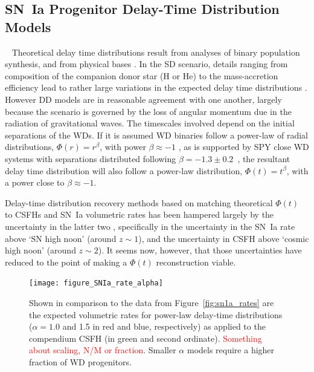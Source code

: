 \documentclass[apj]{aastex62}
\begin{document}
\subsection{SN~Ia Progenitor Delay-Time Distribution Models}~\label{sec:dtd}
Theoretical delay time distributions result from analyses of binary population synthesis, and from physical bases \cite[see][ for a review]{Wang:2012a}.  In the SD scenario, details ranging from composition of the companion donor star (H or He) to the mass-accretion efficiency lead to rather large variations in the expected delay time distributions \cite{Nelemans:2013}. However DD models are in reasonable agreement with one another, largely because the scenario is governed by the loss of angular momentum due in the radiation of gravitational waves. The timescales involved depend on the  initial separations of the WDs. If it is assumed WD binaries follow a power-law of radial distributions, $\Phi(r)=r^{\beta}$, with power $\beta\approx-1$ \citep{Opik:1924xr}, as is supported by  SPY close WD systems with separations distributed following $\beta=-1.3\pm0.2$~\citep{Maoz:2017zl}, the resultant delay time distribution will also follow a power-law distribution, $\Phi(t)=t^{\beta}$, with a power close to $\beta\approx-1$.

Delay-time distribution recovery methods based on matching theoretical $\Phi(t)$ to CSFHs and SN~Ia volumetric rates has been hampered largely by the uncertainty in the latter two \citep{Dahlen:2008,Strolger:2010,Graur:2014,Rodney:2014fj}, specifically in the uncertainty in the SN~Ia rate above `SN high noon' (around $z\sim1$), and the uncertainty in CSFH above `cosmic high noon' (around $z\sim2$). It seems now, however, that those uncertainties have reduced to the point of making a $\Phi(t)$ reconstruction viable.

\begin{figure}[t]
   \centering
   \texttt{[image: figure\_SNIa\_rate\_alpha]}
   \caption{\footnotesize Shown in comparison to the data from Figure~\ref{fig:sn1a_rates} are the expected volumetric rates for power-law delay-time distributions ($\alpha = 1.0$ and 1.5 in red and blue, respectively) as applied to the compendium CSFH (in green and second ordinate). \textcolor{red}{Something about scaling, N/M or fraction}. Smaller $\alpha$ models require a higher fraction of WD progenitors.}
   \label{fig:sn1a_rates2}
\end{figure}
\end{document}
